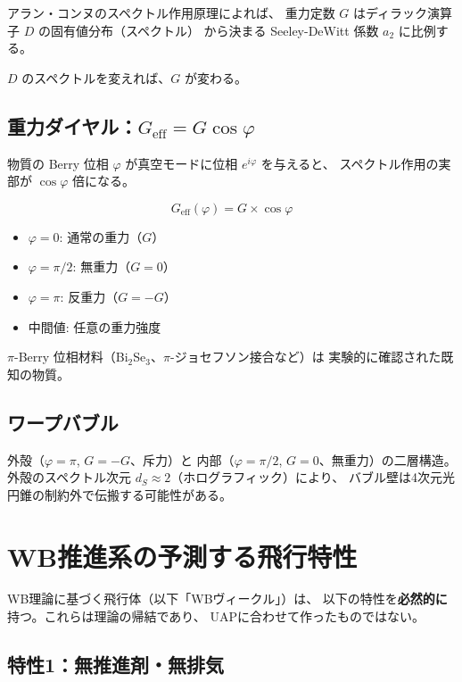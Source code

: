 \documentclass[11pt,a4paper]{article}
\begin{document}
アラン・コンヌのスペクトル作用原理によれば、
重力定数 $G$ はディラック演算子 $D$ の固有値分布（スペクトル）
から決まる Seeley-DeWitt 係数 $a_2$ に比例する。

$D$ のスペクトルを変えれば、$G$ が変わる。

\subsection{重力ダイヤル：$G_{\mathrm{eff}} = G\cos\varphi$}

物質の Berry 位相 $\varphi$ が真空モードに位相 $e^{i\varphi}$ を与えると、
スペクトル作用の実部が $\cos\varphi$ 倍になる。

\begin{equation}
  G_{\mathrm{eff}}(\varphi) = G \times \cos\varphi
\end{equation}

\begin{itemize}
\item $\varphi = 0$: 通常の重力（$G$）
\item $\varphi = \pi/2$: 無重力（$G = 0$）
\item $\varphi = \pi$: 反重力（$G = -G$）
\item 中間値: 任意の重力強度
\end{itemize}

$\pi$-Berry 位相材料（Bi$_2$Se$_3$、$\pi$-ジョセフソン接合など）は
実験的に確認された既知の物質。

\subsection{ワープバブル}

外殻（$\varphi = \pi$, $G = -G$、斥力）と
内部（$\varphi = \pi/2$, $G = 0$、無重力）の二層構造。
外殻のスペクトル次元 $d_S \approx 2$（ホログラフィック）により、
バブル壁は4次元光円錐の制約外で伝搬する可能性がある。

\section{WB推進系の予測する飛行特性}

WB理論に基づく飛行体（以下「WBヴィークル」）は、
以下の特性を\textbf{必然的に}持つ。これらは理論の帰結であり、
UAPに合わせて作ったものではない。

\subsection{特性1：無推進剤・無排気}
\end{document}
